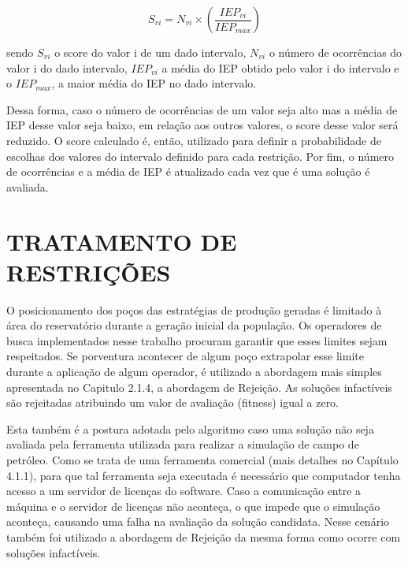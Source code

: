 $$ S_{vi} = N_{vi} \times (\frac{IEP_{vi}}{IEP_{max}})$$ 
  
sendo $S_{vi}$ o score do valor i de um dado intervalo, $N_{vi}$ o número de ocorrências do valor i do dado intervalo, $IEP_{vi}$ a média do IEP obtido pelo valor i do intervalo e o $IEP_{max}$, a maior média do IEP no dado intervalo. 

Dessa forma, caso o número de ocorrências de um valor seja alto mas a média de IEP desse valor seja baixo, em relação aos outros valores, o score desse valor será reduzido. O score calculado é, então, utilizado para definir a probabilidade de escolhas dos valores do intervalo definido para cada restrição. Por fim, o número de ocorrências e a média de IEP é atualizado cada vez que é uma solução é avaliada.

\section{TRATAMENTO DE RESTRIÇÕES}

O posicionamento dos poços das estratégias de produção geradas é limitado à área do reservatório durante a geração inicial da população. Os operadores de busca implementados nesse trabalho procuram garantir que esses limites sejam respeitados. Se porventura acontecer de algum poço extrapolar esse limite durante a aplicação de algum operador, é utilizado a abordagem mais simples apresentada no Capitulo 2.1.4, a abordagem de Rejeição. As soluções infactíveis são rejeitadas atribuindo um valor de avaliação (fitness) igual a zero.

 
Esta também é a postura adotada pelo algoritmo caso uma solução não seja avaliada pela ferramenta utilizada para realizar a simulação de campo de petróleo. Como se trata de uma ferramenta comercial (mais detalhes no Capítulo 4.1.1), para que tal ferramenta seja executada é necessário que computador tenha acesso a um servidor de licenças do software. Caso a comunicação entre a máquina e o servidor de licenças não aconteça, o que impede que o simulação aconteça, causando uma falha na avaliação da solução candidata. Nesse cenário também foi utilizado a abordagem de Rejeição da mesma forma como ocorre com soluções infactíveis.